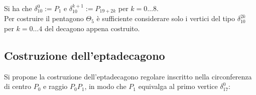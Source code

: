 \noindent
Si ha che $\delta_{10}^{0} := P_{1} $ e $\delta_{10}^{k+1} := P_{19 + 2k}$ per $k = 0 \dots 8$.
\\
Per costruire il pentagono $\Theta_{5}$ è sufficiente considerare solo i vertici del tipo $\delta_{10}^{2k}$ per $k = 0 \dots 4 $ del decagono appena costruito.

\subsection{Costruzione dell'eptadecagono}

Si propone la costruzione dell'eptadecagono regolare inscritto nella circonferenza di centro $P_{0}$ e raggio $P_{0} P_{1}$, in modo che $P_{1}$ equivalga al primo vertice $\delta_{17}^{0}$:

